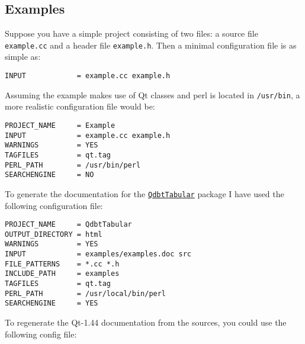 \subsection*{Examples}

Suppose you have a simple project consisting of two files: a source file {\tt example.cc} and a header file {\tt example.h}. Then a minimal configuration file is as simple as: 

\footnotesize\begin{verbatim}
INPUT            = example.cc example.h
\end{verbatim}
\normalsize


Assuming the example makes use of Qt classes and perl is located in {\tt /usr/bin}, a more realistic configuration file would be: 

\footnotesize\begin{verbatim}
PROJECT_NAME     = Example
INPUT            = example.cc example.h
WARNINGS         = YES
TAGFILES         = qt.tag
PERL_PATH        = /usr/bin/perl
SEARCHENGINE     = NO
\end{verbatim}
\normalsize


To generate the documentation for the \href{http://www.stack.nl/~dimitri/qdbttabular/index.html}{\tt QdbtTabular} package I have used the following configuration file: 

\footnotesize\begin{verbatim}
PROJECT_NAME     = QdbtTabular
OUTPUT_DIRECTORY = html
WARNINGS         = YES
INPUT            = examples/examples.doc src
FILE_PATTERNS    = *.cc *.h
INCLUDE_PATH     = examples
TAGFILES         = qt.tag
PERL_PATH        = /usr/local/bin/perl
SEARCHENGINE     = YES
\end{verbatim}
\normalsize


To regenerate the Qt-1.44 documentation from the sources, you could use the following config file: 

